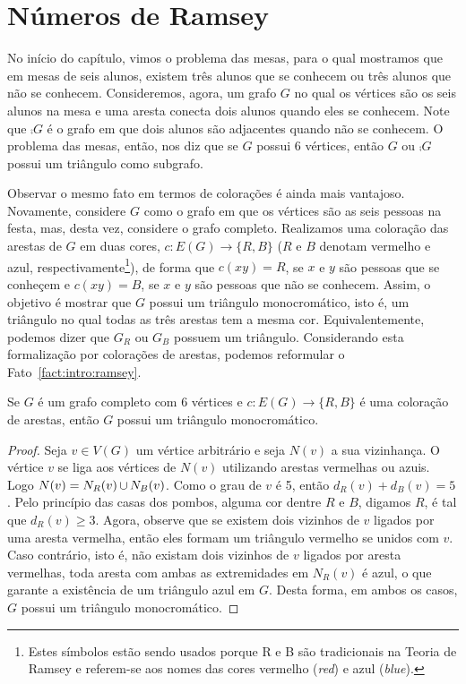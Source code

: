 
\section{Números de Ramsey}

No início do capítulo, vimos o problema das mesas, para o qual mostramos que em mesas de seis alunos, existem três alunos que se conhecem ou três alunos que não se conhecem. Consideremos, agora, um grafo $G$ no qual os vértices são os seis alunos na mesa e uma aresta conecta dois alunos quando eles se conhecem. Note que $\comp{G}$ é o grafo em que dois alunos são adjacentes quando não se conhecem. O problema das mesas, então, nos diz que se $G$ possui 6 vértices, então $G$ ou $\comp{G}$ possui um triângulo como subgrafo.

Observar o mesmo fato em termos de colorações é ainda mais vantajoso. Novamente, considere $G$ como o grafo em que os vértices são as seis pessoas na festa, mas, desta vez, considere o grafo completo. Realizamos uma coloração das arestas de $G$ em duas cores, $c: E(G) \to \{ R,B \}$ ($R$ e $B$ denotam vermelho e azul, respectivamente\footnote{Estes símbolos estão sendo usados porque R e B são tradicionais na Teoria de Ramsey e referem-se aos nomes das cores vermelho (\emph{red}) e azul (\emph{blue}).}), de forma que $c(xy) = R$, se $x$ e $y$ são pessoas que se conheçem e $c(xy) = B$, se $x$ e $y$ são pessoas que não se conhecem.
Assim, o objetivo é mostrar que $G$ possui um triângulo monocromático, isto é, um triângulo no qual todas as três arestas tem a mesma cor. Equivalentemente, podemos dizer que $G_R$ ou $G_B$ possuem um triângulo. Considerando esta formalização por colorações de arestas, podemos reformular o Fato~\ref{fact:intro:ramsey}.

\begin{proposition}
\label{thm:intro:r33}
Se $G$ é um grafo completo com 6 vértices e $c: E(G) \to \{ R,B\}$ é uma coloração de arestas, então $G$ possui um triângulo monocromático.
\end{proposition}
\begin{proof}
Seja $v \in V(G)$ um vértice arbitrário e seja $N(v)$ a sua vizinhança. O vértice $v$ se liga aos vértices de $N(v)$ utilizando arestas vermelhas ou azuis. Logo $N(v) = N_R(v) \operatorname{\cup} N_B(v)$. Como o grau de $v$ é 5, então $d_R(v) + d_B(v) = 5$. Pelo princípio das casas dos pombos, alguma cor dentre $R$ e $B$, digamos $R$, é tal que $d_R(v) \geq 3$. Agora, observe que se existem dois vizinhos de $v$ ligados por uma aresta vermelha, então eles formam um triângulo vermelho se unidos com $v$. Caso contrário, isto é, não existam dois vizinhos de $v$ ligados por aresta vermelhas, toda aresta com ambas as extremidades em $N_R(v)$ é azul, o que garante a existência de um triângulo azul em $G$. Desta forma, em ambos os casos, $G$ possui um triângulo monocromático.
\end{proof}


